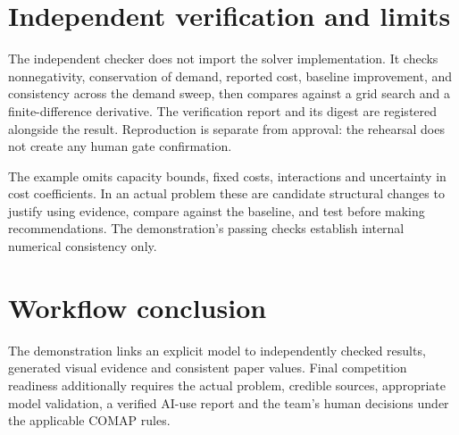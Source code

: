 \section{Independent verification and limits}
The independent checker does not import the solver implementation. It checks
nonnegativity, conservation of demand, reported cost, baseline improvement,
and consistency across the demand sweep, then compares against a grid search
and a finite-difference derivative. The verification report and its digest
are registered alongside the result. Reproduction is separate from approval:
the rehearsal does not create any human gate confirmation.

The example omits capacity bounds, fixed costs, interactions and uncertainty
in cost coefficients. In an actual problem these are candidate structural
changes to justify using evidence, compare against the baseline, and test
before making recommendations. The demonstration's passing checks establish
internal numerical consistency only.

\section{Workflow conclusion}
The demonstration links an explicit model to independently checked results,
generated visual evidence and consistent paper values. Final competition
readiness additionally requires the actual problem, credible sources,
appropriate model validation, a verified AI-use report and the team's human
decisions under the applicable COMAP rules\cite{comap2025ai}.

